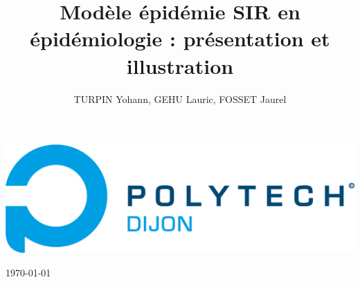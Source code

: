 \documentclass[11pt]{report}
\title{Modèle épidémie SIR en épidémiologie : présentation et illustration}
\author{TURPIN Yohann, GEHU Lauric, FOSSET Jaurel}
\begin{document}
    \cfoot{\thepage}
    
    \makeatletter
    \begin{titlepage}
        \reversemarginpar\marginpar
        {
            \vspace{-86pt}
            \hspace*{25pt}
            \includegraphics{logo_esirem.png}
        }
        
        {\centering
            \vspace{3cm}
            \par\vspace{5cm}
            {\scshape\huge\textbf{\hspace{2cm}\@title}} \par\vspace{6cm}
            
            {\LARGE
            \begin{flushright}
                    \item \@author
                    \item \today
            \end{flushright}
            }
        }
    \end{titlepage}
    \makeatother

    \thispagestyle{empty}
    \addtocounter{page}{-1}
  
    
    \tableofcontents
	\thispagestyle{empty}
	\newpage

    \setlength{\abovedisplayskip}{6pt}
    \setlength{\belowdisplayskip}{6pt}


    
    
    
    
    
    

    \listoffigures

	
\end{document}
